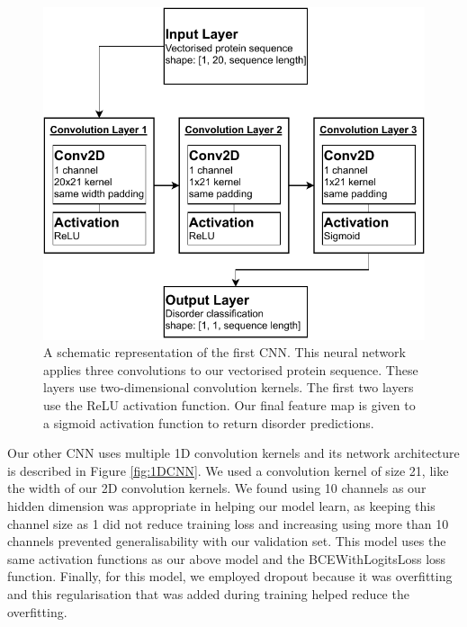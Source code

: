 \documentclass{l4proj}
\begin{document}
\begin{figure}[!ht]
    \centering
    \includegraphics[width=0.75\linewidth]{images/2DCNNdraw.pdf}    

    \caption{A schematic representation of the first CNN. This neural network applies three convolutions to our vectorised protein sequence. These layers use two-dimensional convolution kernels. The first two layers use the ReLU activation function. Our final feature map is given to a sigmoid activation function to return disorder predictions.}

    \label{fig:2DCNN} 
\end{figure}

Our other CNN uses multiple 1D convolution kernels and its network architecture is described in Figure \ref{fig:1DCNN}. We used a convolution kernel of size 21, like the width of our 2D convolution kernels. We found using 10 channels as our hidden dimension was appropriate in helping our model learn, as keeping this channel size as 1 did not reduce training loss and increasing using more than 10 channels prevented generalisability with our validation set. This model uses the same activation functions as our above model and the BCEWithLogitsLoss loss function. Finally, for this model, we employed dropout because it was overfitting and this regularisation that was added during training helped reduce the overfitting.
\end{document}
